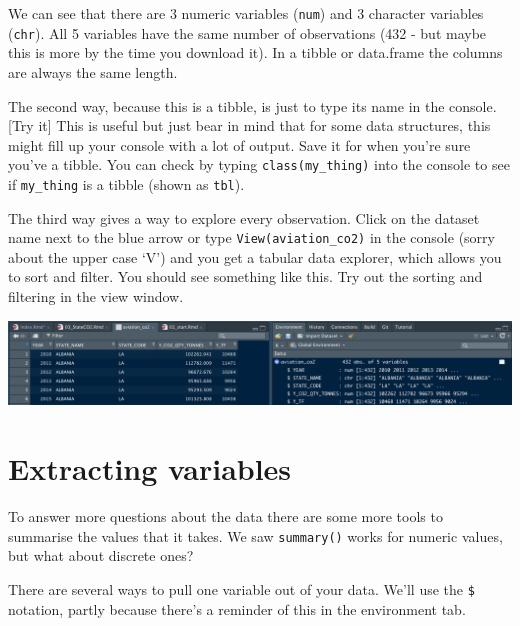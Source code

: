\documentclass[
]{book}
\newenvironment{Shaded}{\begin{snugshade}}{\end{snugshade}}
\newcommand{\CommentTok}[1]{\textcolor[rgb]{0.56,0.35,0.01}{\textit{#1}}}
\newcommand{\FunctionTok}[1]{\textcolor[rgb]{0.00,0.00,0.00}{#1}}
\newcommand{\NormalTok}[1]{#1}
\newcommand{\OtherTok}[1]{\textcolor[rgb]{0.56,0.35,0.01}{#1}}
\newcommand{\SpecialCharTok}[1]{\textcolor[rgb]{0.00,0.00,0.00}{#1}}
\begin{document}
We can see that there are 3 numeric variables (\texttt{num}) and 3 character variables (\texttt{chr}). All 5 variables have the same number of observations (432 - but maybe this is more by the time you download it). In a tibble or data.frame the columns are always the same length.

The second way, because this is a tibble, is just to type its name in the console. {[}Try it{]} This is useful but just bear in mind that for some data structures, this might fill up your console with a lot of output. Save it for when you're sure you've a tibble. You can check by typing \texttt{class(my\_thing)} into the console to see if \texttt{my\_thing} is a tibble (shown as \texttt{tbl}).

The third way gives a way to explore every observation. Click on the dataset name next to the blue arrow or type \texttt{View(aviation\_co2)} in the console (sorry about the upper case `V') and you get a tabular data explorer, which allows you to sort and filter. You should see something like this. Try out the sorting and filtering in the view window.

\includegraphics{images/CO2inViewAndEnvironment.png}

\hypertarget{extracting-variables}{%
\section{Extracting variables}\label{extracting-variables}}

To answer more questions about the data there are some more tools to summarise the values that it takes. We saw \texttt{summary()} works for numeric values, but what about discrete ones?

There are several ways to pull one variable out of your data. We'll use the \texttt{\$} notation, partly because there's a reminder of this in the environment tab.

\begin{Shaded}
\end{Shaded}
\end{document}
